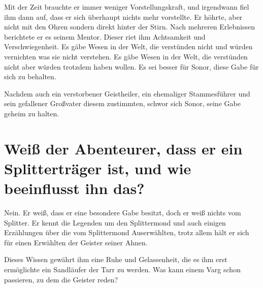 	Mit der Zeit brauchte er immer weniger Vorstellungskraft, und irgendwann
	fiel ihm dann auf, dass er sich überhaupt nichts mehr vorstellte. Er
	höhrte, aber nicht mit den Ohren sondern direkt hinter der Stirn.
	Nach mehreren Erlebnissen berichtete er es seinem Mentor. Dieser riet
	ihm Achtsamkeit und Verschwiegenheit. Es gäbe Wesen in der Welt,
	die verstünden nicht und würden vernichten was sie nicht verstehen. Es
	gäbe Wesen in der Welt, die verstünden nicht aber würden trotzdem haben
	wollen. Es sei besser für Sonor, diese Gabe für sich zu behalten.

	Nachdem auch ein verstorbener Geistheiler, ein ehemaliger Stammesführer
	und sein gefallener Großvater diesem zustimmten, schwor sich Sonor,
	seine Gabe geheim zu halten.


	\section[Splitter]{Weiß der Abenteurer, dass er ein Splitterträger ist, und wie beeinflusst ihn das?}


	Nein. Er weiß, dass er eine besondere Gabe besitzt, doch er weiß nichts
	vom Splitter. Er kennt die Legenden um den Splittermond und auch einigen
	Erzählungen über die vom Splittermond Auserwählten, trotz allem hält er
	sich für einen Erwählten der Geister seiner Ahnen.

	Dieses Wissen gewährt ihm eine Ruhe und Gelassenheit, die es ihm erst
	ermöglichte ein Sandläufer der Tarr zu werden.
	Was kann einem Varg schon passieren, zu dem die Geister reden?